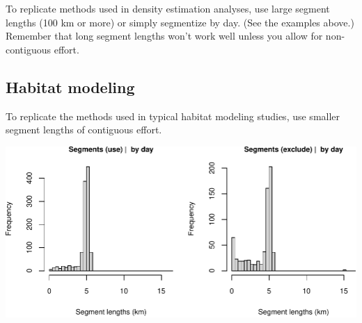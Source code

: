 \documentclass[
]{book}
\newenvironment{Shaded}{\begin{snugshade}}{\end{snugshade}}
\newcommand{\CommentTok}[1]{\textcolor[rgb]{0.56,0.35,0.01}{\textit{#1}}}
\newcommand{\DataTypeTok}[1]{\textcolor[rgb]{0.13,0.29,0.53}{#1}}
\newcommand{\DecValTok}[1]{\textcolor[rgb]{0.00,0.00,0.81}{#1}}
\newcommand{\FloatTok}[1]{\textcolor[rgb]{0.00,0.00,0.81}{#1}}
\newcommand{\KeywordTok}[1]{\textcolor[rgb]{0.13,0.29,0.53}{\textbf{#1}}}
\newcommand{\NormalTok}[1]{#1}
\newcommand{\OperatorTok}[1]{\textcolor[rgb]{0.81,0.36,0.00}{\textbf{#1}}}
\newcommand{\OtherTok}[1]{\textcolor[rgb]{0.56,0.35,0.01}{#1}}
\newcommand{\StringTok}[1]{\textcolor[rgb]{0.31,0.60,0.02}{#1}}
\begin{document}
To replicate methods used in density estimation analyses, use large segment lengths (100 km or more) or simply segmentize by day. (See the examples above.) Remember that long segment lengths won't work well unless you allow for non-contiguous effort.

\hypertarget{habitat-modeling}{%
\subsection*{Habitat modeling}\label{habitat-modeling}}

To replicate the methods used in typical habitat modeling studies, use smaller segment lengths of contiguous effort.

\begin{Shaded}
\end{Shaded}

\includegraphics{figures/unnamed-chunk-382-1.pdf}
\end{document}
